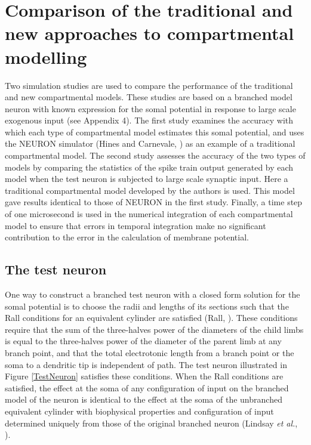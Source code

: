 \section{Comparison of the traditional and new approaches to
compartmental modelling}

Two simulation studies are used to compare the performance of the
traditional and new compartmental models. These studies are based
on a branched model neuron with known expression for the somal
potential in response to large scale exogenous input (see Appendix
4). The first study examines the accuracy with which each type of
compartmental model estimates this somal potential, and uses the
NEURON simulator (Hines and Carnevale, \cite{Hines97}) as an
example of a traditional compartmental model. The second study
assesses the accuracy of the two types of models by comparing the
statistics of the spike train output generated by each model when
the test neuron is subjected to large scale synaptic input. Here a
traditional compartmental model developed by the authors is used.
This model gave results identical to those of NEURON in the first
study. Finally, a time step of one microsecond is used in the
numerical integration of each compartmental model to ensure that
errors in temporal integration make no significant contribution to
the error in the calculation of membrane potential.

\subsection{The test neuron}

One way to construct a branched test neuron with a closed form
solution for the somal potential is to choose the radii and
lengths of its sections such that the Rall conditions for an
equivalent cylinder are satisfied (Rall, \cite{Rall64}). These
conditions require that the sum of the three-halves power of the
diameters of the child limbs is equal to the three-halves power of
the diameter of the parent limb at any branch point, and that the
total electrotonic length from a branch point or the soma to a
dendritic tip is independent of path. The test neuron illustrated
in Figure \ref{TestNeuron} satisfies these conditions. When the
Rall conditions are satisfied, the effect at the soma of any
configuration of input on the branched model of the neuron is
identical to the effect at the soma of the unbranched equivalent
cylinder with biophysical properties and configuration of input
determined uniquely from those of the original branched neuron
(Lindsay \emph{et al.}, \cite{Lindsay03}).

